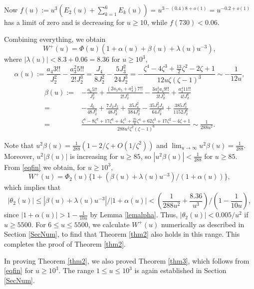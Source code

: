 \documentclass[11pt]{amsart}
\begin{document}
Now $f(u):=u^3(E_2(u)+\sum_{k=1}^6 E_k(u))=u^{3-(0.4)8+o(1)}=u^{-0.2+o(1)}$ has a limit of zero and is decreasing for $u\ge 10$, while 
$f(730)<0.06$. 

Combining everything, we obtain 
\begin{equation}\label{eqfin}
W^+(u) = \Phi(u) \left(1+\alpha(u) +\beta(u)+\lambda(u) u^{-3}\right),
\end{equation}
where $|\lambda(u)|<8.3 + 0.06 =8.36$ for $u\ge 10^3$,
$$
\alpha(u) := \frac{a_4 3!!}{J_2^2} - \frac{a_3^2 5!!}{2! J_2^3}
=\frac{J_4}{8 J_2^2}-\frac{5J_3^2}{24 J_2^3}  
=-\frac{ \zeta^4-4 \zeta^3+\frac{13}{2} \zeta^2-2 \zeta+1}{ 12u \zeta (\zeta-1)^3 }
\sim -\frac{1}{12u},
$$
\begin{equation*}
\begin{split}
\beta(u):= & -\frac{a_6 5!!}{J_2^3}+\frac{(2 a_3 a_5 + a_4^2) 7!!}{2! J_2^4}- \frac{3a_3^2 a_4 9!!}{3! J_2^5}
+\frac{a_3^4 11!!}{4! J_2^6}\\
= & 
-\frac{J_6}{48 J_2^3}
+\frac{7 J_3 J_5}{48  J_2^4}
+\frac{35 J_4^2}{384 J_2^4}
-\frac{35 J_3^2 J_4}{64 J_2^5}
+\frac{385 J_3^4}{1152 J_2^6}\\
= & \frac{\zeta^8-8 \zeta^7+17 \zeta^6+4\zeta^5+\frac{25}{4} \zeta^4+62 \zeta^3+17\zeta^2-4 \zeta+1}{288u^2 \zeta^2 (\zeta-1)^6}
 \sim \frac{1}{288 u^2}.
\end{split}
\end{equation*}

Note that $u^2 \beta(u)=  \frac{1}{288}(1-2/\zeta +O(1/\zeta^2))$ and
$\lim_{u\to \infty} u^2 \beta(u) = \frac{1}{288}$. 
Moreover, $u^2 |\beta(u)|$ is increasing for $u\ge 85$,
so $|u^2 \beta(u) |< \frac{1}{288}$ for $u\ge 85$. 
From \eqref{eqfin} we obtain, for $u\ge 10^3$,
$$
W^+(u)=\Phi_2(u)\{1+ (\beta(u)+\lambda(u)u^{-3})/(1+\alpha(u))\},
$$
which implies that
\begin{equation}\label{eqtheta2}
|\theta_2(u)|\le |\beta(u) + \lambda(u) u^{-3} | /|1+\alpha(u)| <\left(\frac{1}{288u^2} + \frac{8.36}{u^3}\right)/\left(1-\frac{1}{10u}\right),
\end{equation}
since $|1+\alpha(u)|>1-\frac{1}{10u}$ by Lemma \ref{lemalpha}.
Thus, $|\theta_2(u)|<0.005/u^2$ if $u\ge 5500$. 
For $6\le u \le 5500$, we calculate $W^+(u)$ numerically as described in Section \ref{SecNum}, 
to find that Theorem \ref{thm2} also holds in this range.
This completes the proof of Theorem \ref{thm2}.

In proving Theorem \ref{thm2}, we also proved Theorem \ref{thm3}, which follows from \eqref{eqfin} for $u\ge 10^3$.
The range $1\le u\le 10^3$ is again established in Section \ref{SecNum}. 
\end{document}

